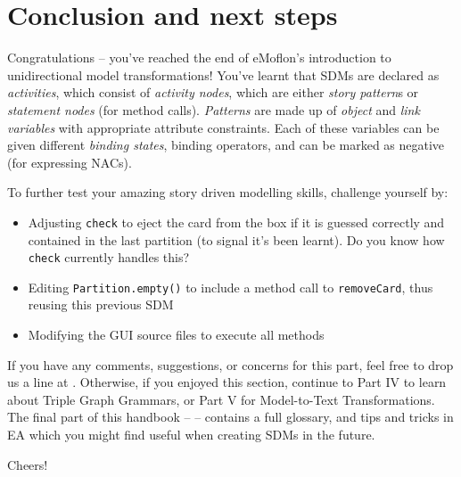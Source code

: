 \genHeader
\chapter{Conclusion and next steps}

\vspace{0.5cm}

Congratulations -- you've reached the end of eMoflon's introduction to unidirectional model transformations! You've learnt that SDMs are declared as
\emph{activities}, which consist of \emph{activity nodes}, which are either \emph{story pattern}s or \emph{statement nodes} (for method calls).
\emph{Patterns} are made up of \emph{object} and \emph{link variables} with appropriate attribute constraints. Each of these variables can be given
different \emph{binding states}, binding operators, and can be marked as negative (for expressing NACs).

\vspace{0.5cm}

To further test your amazing story driven modelling skills, challenge yourself by:
\begin{itemize}
\item Adjusting \texttt{check} to eject the card from the box if it is guessed correctly and contained in the last partition (to signal it's been learnt). Do
you know how \texttt{check} currently handles this?
\item Editing \texttt{Partition.empty()} to include a method call to \texttt{removeCard}, thus reusing this previous SDM
\item Modifying the GUI source files to execute all methods
\end{itemize}

\vspace{0.5cm}
	
If you have any comments, suggestions, or concerns for this part, feel free to drop us a line at \eMoflonContact.
Otherwise, if you enjoyed this section, continue to Part IV to learn about Triple Graph Grammars, or Part V for Model-to-Text Transformations.
The final part of this handbook --  -- contains a full glossary, and tips and tricks in EA which you might find useful when creating SDMs in the future.

Cheers!
